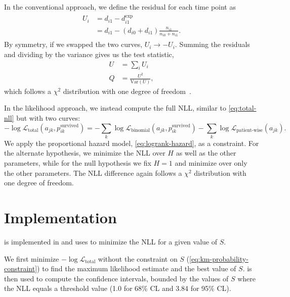 \documentclass[article]{jss}
\begin{document}
In the conventional approach, we define the residual for each time point as
\begin{align}
\begin{aligned}
U_i&=d_{i1} - d_{i1}^\text{exp} \\
&=d_{i1} - (d_{i0} + d_{i1})\frac{n_{i1}}{n_{i0}+n_{i1}}.
\end{aligned}
\end{align}
By symmetry, if we swapped the two curves, \(U_i\rightarrow-U_i\).  Summing the residuals and dividing by the variance gives us the test statistic,
\begin{align}
U&=\sum_i U_i \\
Q&=\frac{U^2}{\text{Var}(U)},
\end{align}
which follows a \(\chi^2\) distribution with one degree of freedom~\citep[pp.~45--47]{mantel1966evaluation,peto1972asymptotically,appliedsurvivalanalysis}.

In the likelihood approach, we instead compute the full NLL, similar to \cref{eq:total-nll} but with two curves:
\begin{equation}
-\log \mathcal{L}_{\text{total}}(a_{jk}, p_{ik}^\text{survived}) = -\sum_{k}\log\mathcal{L}_\text{binomial}(a_{jk}, p_{ik}^\text{survived}) - \sum_{k}\log\mathcal{L}_\text{patient-wise}(a_{jk}).
\label{eq:two-curve-nll}
\end{equation}
We apply the proportional hazard model, \cref{eq:logrank-hazard}, as a constraint.  For the alternate hypothesis, we minimize the NLL over \(H\) as well as the other parameters, while for the null hypothesis we fix \(H=1\) and minimize over only the other parameters.  The NLL difference again follows a \(\chi^2\) distribution with one degree of freedom.

\section{Implementation}

 is implemented in  and uses  \citep{gurobi} to minimize the NLL for a given value of \(S\).

We first minimize \(-\log \mathcal{L}_{\text{total}}\) without the constraint on \(S\) (\ref{eq:km-probability-constraint}) to find the maximum likelihood estimate and the best value of \(S\)\@.   \citep{brentq,scipy} is then used to compute the confidence intervals, bounded by the values of \(S\) where the NLL equals a threshold value (1.0 for 68\% CL and 3.84 for 95\% CL).
\end{document}
